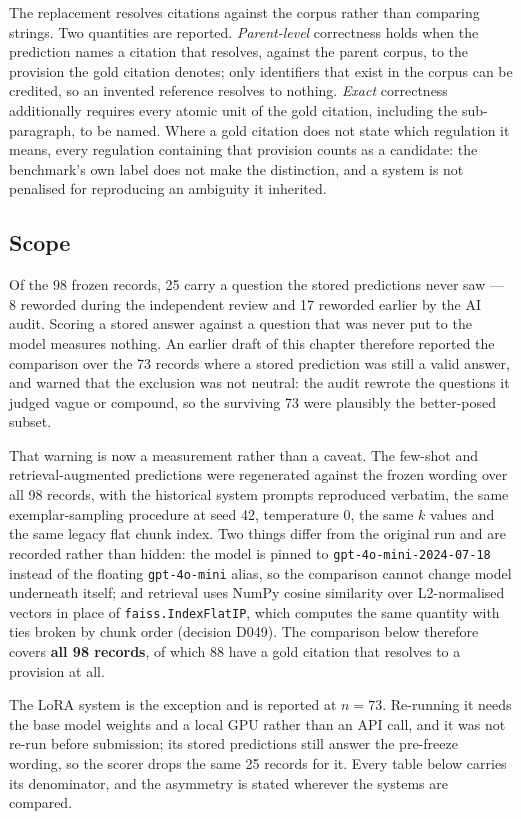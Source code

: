 The replacement resolves citations against the corpus rather than comparing
strings. Two quantities are reported. \emph{Parent-level} correctness holds when
the prediction names a citation that resolves, against the parent corpus, to the
provision the gold citation denotes; only identifiers that exist in the corpus can
be credited, so an invented reference resolves to nothing. \emph{Exact}
correctness additionally requires every atomic unit of the gold citation,
including the sub-paragraph, to be named. Where a gold citation does not state
which regulation it means, every regulation containing that provision counts as a
candidate: the benchmark's own label does not make the distinction, and a system
is not penalised for reproducing an ambiguity it inherited.

\subsection{Scope}

Of the 98 frozen records, 25 carry a question the stored predictions never saw
--- 8 reworded during the independent review and 17 reworded earlier by the AI
audit. Scoring a stored answer against a question that was never put to the model
measures nothing. An earlier draft of this chapter therefore reported the
comparison over the 73 records where a stored prediction was still a valid
answer, and warned that the exclusion was not neutral: the audit rewrote the
questions it judged vague or compound, so the surviving 73 were plausibly the
better-posed subset.

That warning is now a measurement rather than a caveat. The few-shot and
retrieval-augmented predictions were regenerated against the frozen wording over
all 98 records, with the historical system prompts reproduced verbatim, the same
exemplar-sampling procedure at seed 42, temperature 0, the same $k$ values and
the same legacy flat chunk index. Two things differ from the original run and are
recorded rather than hidden: the model is pinned to
\texttt{gpt-4o-mini-2024-07-18} instead of the floating \texttt{gpt-4o-mini}
alias, so the comparison cannot change model underneath itself; and retrieval
uses NumPy cosine similarity over L2-normalised vectors in place of
\texttt{faiss.IndexFlatIP}, which computes the same quantity with ties broken by
chunk order (decision D049). The comparison below therefore covers \textbf{all 98
records}, of which 88 have a gold citation that resolves to a provision at all.

The LoRA system is the exception and is reported at $n = 73$. Re-running it needs
the base model weights and a local GPU rather than an API call, and it was not
re-run before submission; its stored predictions still answer the pre-freeze
wording, so the scorer drops the same 25 records for it. Every table below carries
its denominator, and the asymmetry is stated wherever the systems are compared.

